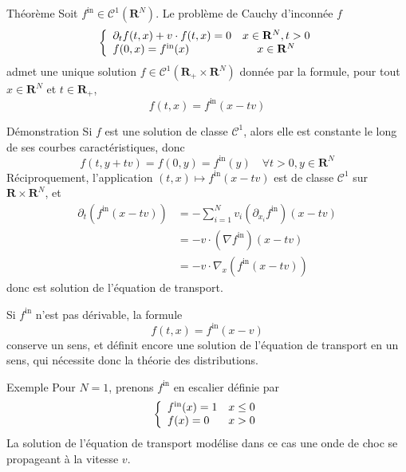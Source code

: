         \begin{omed}{Théorème}
            Soit $f^{\text{in}} \in \mathcal{C}^1(\mathbf{R}^N)$. Le problème de Cauchy d’inconnée $f$
            \[ \left\{ \begin{array}{lc}
                \partial_t f(t,x) + v \cdot f(t,x) = 0 & x \in \mathbf{R}^N, t>0 \\
                f(0,x) = f^{\text{in}}(x) & x \in \mathbf{R}^N \\
            \end{array} \right. \kern-\nulldelimiterspace \] 
            admet une unique solution $f \in \mathcal{C}^1(\mathbf{R}_+ \times \mathbf{R}^N)$ donnée par la formule, pour tout $x \in \mathbf{R}^N$ et $t \in \mathbf{R}_+$,
            \[ f(t,x) = f^{\text{in}}(x - tv) \]   
        \end{omed}

        \begin{demo}{Démonstration}
            Si $f$ est une solution de classe $\mathcal{C}^1$, alors elle est constante le long de ses courbes caractéristiques, donc 
            \[ f(t, y + tv) = f(0, y) = f^{\text{in}}(y) \quad \forall t > 0, y \in \mathbf{R}^N \]   
            Réciproquement, l’application $(t,x) \mapsto f^{\text{in}}(x - tv)$ est de classe $\mathcal{C}^1$ sur $\mathbf{R} \times \mathbf{R}^N$, et 
            \begin{align*}
                \partial_t(f^{\text{in}}(x - tv)) 
                &= - \sum_{i =1}^N v_i (\partial_{x_i} f^{\text{in}})(x - tv) \\
                &= - v \cdot (\nabla f^{\text{in}})(x - tv) \\
                &= - v \cdot \nabla_x(f^{\text{in}}(x - tv)) 
            \end{align*}
            donc est solution de l’équation de transport.
        \end{demo}

        Si $f^{\text{in}}$ n’est pas dérivable, la formule 
        \[ f(t,x) = f^{\text{in}}(x - v) \]    
        conserve un sens, et définit encore une solution de l’équation de transport en un sens, qui nécessite donc la théorie des distributions.

        \begin{demo}{Exemple}
            Pour $N = 1$, prenons $f^{\text{in}}$ en escalier définie par 
            \[ \left\{      \begin{array}{lc}
                f^{\text{in}}(x) = 1 & x \leq 0 \\
                f(x) = 0 & x > 0
            \end{array} \right. \kern-\nulldelimiterspace \]   
            La solution de l’équation de transport modélise dans ce cas une onde de choc se propageant à la vitesse $v$.
        \end{demo}

